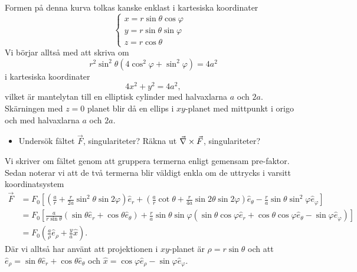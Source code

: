\documentclass[%
oneside,                 %
final,                   %
10pt]{article}
\newenvironment{notice_mdfboxadmon}[1][]{
\begin{notice_mdfboxmdframed}[frametitle=#1]
}
{
\end{notice_mdfboxmdframed}
}
\begin{document}
\begin{notice_mdfboxadmon}
\noindent
Formen på denna kurva tolkas kanske enklast i kartesiska koordinater
\begin{equation}
\left\{
\begin{array}{ll}
x = r \sin\theta \cos\varphi & \\
y = r \sin\theta \sin\varphi & \\
z = r\cos\theta
\end{array}
\right.
\end{equation}
Vi börjar alltså med att skriva om 
\begin{equation}
  r^2 \sin^2 \theta \left(4 \cos^2 \varphi + \sin^2 \varphi\right) = 4 a^2
\end{equation}
i kartesiska koordinater
\begin{equation}
  4x^2 + y^2 = 4a^2,
\end{equation}
vilket är mantelytan till en elliptisk cylinder med halvaxlarna $a$ och $2a$. Skärningen med $z=0$ planet blir då en ellips i $xy$-planet med mittpunkt i origo och med halvaxlarna $a$ och $2a$.
\begin{itemize}
\item Undersök fältet $\vec{F}$, singulariteter? Räkna ut $\vec{\nabla} \times \vec{F}$, singulariteter?
\end{itemize}

\noindent
Vi skriver om fältet genom att gruppera termerna enligt gemensam pre-faktor. Sedan noterar vi att de två termerna blir väldigt enkla om de uttrycks i varsitt koordinatsystem
\begin{align}
  \vec{F} &= F_0 \left[\left(\frac{a}{r} + \frac{r}{2a} \sin^2 \theta 
\sin 2\varphi\right) \hat{e}_r + \left(\frac{a}{r} \cot \theta + 
\frac{r}{4a} \sin 2\theta \sin 2\varphi\right) \hat{e}_\theta -
\frac{r}{a} \sin \theta \sin^2 \varphi \hat{e}_\varphi \right]
\nonumber \\
&= F_0 \left[\frac{a}{r\sin \theta} \left(\sin \theta \hat{e}_r + 
\cos \theta \hat{e}_\theta \right) + \frac{r}{a} \sin \theta \sin \varphi
\left( \sin \theta \cos \varphi \hat{e}_r + \cos \theta \cos \varphi 
\hat{e}_\theta - \sin \varphi \hat{e}_\varphi \right) \right]
\nonumber \\
&= F_0 \left(\frac{a}{\rho} \hat{e}_\rho + \frac{y}{a} \hat{x} \right).
\end{align}
Där vi alltså har använt att projektionen i $xy$-planet är $\rho = r \sin\theta$ och att $\hat{e}_\rho = \sin\theta \hat{e}_r + \cos\theta \hat{e}_\theta$ och $\hat{x} = \cos\varphi \hat{e}_\rho - \sin\varphi \hat{e}_\varphi$.


\end{notice_mdfboxadmon}
\end{document}
